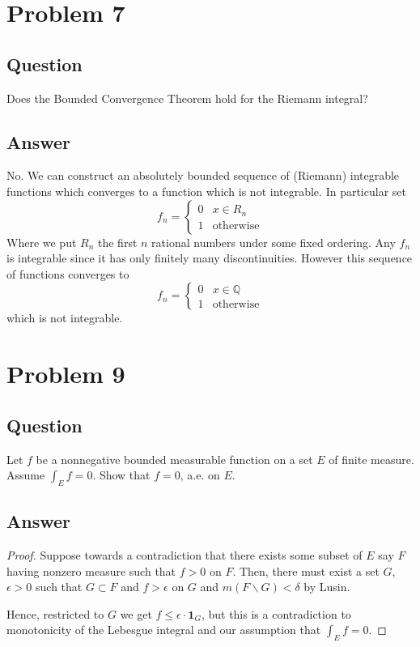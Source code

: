\documentclass[12pt]{article}
\begin{document}
\section{Problem 7}
\subsection{Question}
Does the Bounded Convergence Theorem hold for the Riemann integral? 
\subsection{Answer}
No. We can construct an absolutely bounded sequence of (Riemann) integrable functions which converges to a function which is not integrable. In particular set
\[f_n = \left\{ \begin{array}{ll} 0 & x \in R_n \\ 1 & \mathrm{otherwise} \end{array}\right. \]
Where we put $R_n$ the first $n$ rational numbers under some fixed ordering. Any $f_n$ is integrable since it has only finitely many discontinuities. However this sequence of functions converges to 
\[f_n = \left\{ \begin{array}{ll} 0 & x \in \mathbb{Q} \\ 1 & \mathrm{otherwise} \end{array}\right. \]
which is not integrable.

\section{Problem 9}
\subsection{Question}
Let $f$ be a nonnegative bounded measurable function on a set $E$ of finite measure. Assume $\int_E f = 0$. Show that $f = 0$, a.e. on $E$. 
\subsection{Answer}
\begin{proof}
Suppose towards a contradiction that there exists some subset of $E$ say $F$ having nonzero measure such that $f>0$ on $F$. Then, there must exist a set $G$, $\epsilon>0$ such that $G \subset F$ and $f> \epsilon$ on $G$  and $m(F\backslash G)< \delta$ by Lusin.

Hence, restricted to $G$ we get $f \leq \epsilon \cdot \mathbf{1}_G $, but this is a contradiction to monotonicity of the Lebesgue integral and our assumption that $\int_E f =0$.
\end{proof}
\end{document}
